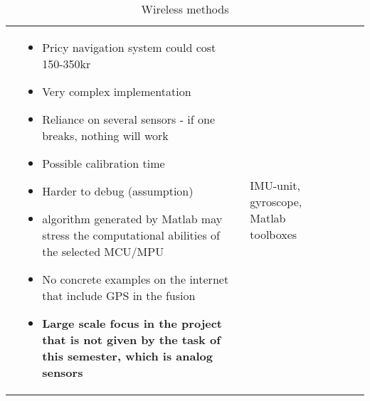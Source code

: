 \documentclass[../report.tex]{subfiles}
\begin{document}
\begin{table}[H]
\begin{tabularx}{\linewidth}{c|L|L|L|c}
\begin{itemize}
            \end{itemize}
            & 
            \begin{itemize}
                \item Pricy navigation system could cost 150-350kr
                \item Very complex implementation
                \item Reliance on several sensors - if one breaks, nothing will work
                \item Possible calibration time
                \item Harder to debug (assumption)
                \item algorithm generated by Matlab may stress the computational abilities of the selected MCU/MPU
                \item No concrete examples on the internet that include GPS in the fusion
                \item \textbf{Large scale focus in the project that is not given by the task of this semester, which is analog sensors}
            \end{itemize}
            & IMU-unit, gyroscope, Matlab toolboxes
            \\    
              
        \end{tabularx}
    \caption{Wireless methods}
    \label{tab:my_label}
    \end{table}
    
\end{document}
